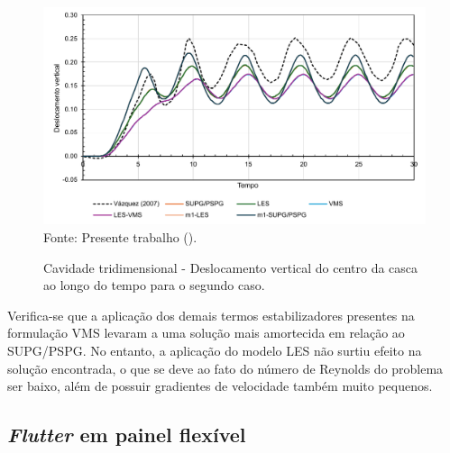 \begin{figure}[h!]
    \centering
    \caption{Cavidade tridimensional - Deslocamento vertical do centro da casca ao longo do tempo para o segundo caso.}
    \includegraphics[width=\linewidth]{Figuras/FSI-Cavity3D/FSI-cavity3D.pdf}
    \\Fonte: Presente trabalho (\the\year).
    \label{fig:Cavity3D-rescoarse}
\end{figure}

Verifica-se que a aplicação dos demais termos estabilizadores presentes na formulação VMS levaram a uma solução mais amortecida em relação ao SUPG/PSPG. No entanto, a aplicação do modelo LES não surtiu efeito na solução encontrada, o que se deve ao fato do número de Reynolds do problema ser baixo, além de possuir gradientes de velocidade também muito pequenos.

\newpage
\subsection{\textit{Flutter} em painel flexível} \label{FSI-prism}

